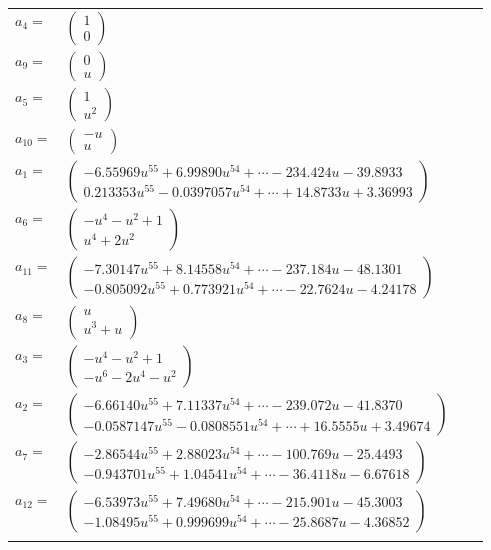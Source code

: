 \documentclass[1p]{elsarticle_modified}
\theoremstyle{definition}
\begin{document}
\begin{tabular}{m{7pt} m{180pt} m{7pt} m{180pt} }
\flushright $a_{4}=$&$\begin{pmatrix}1\\0\end{pmatrix}$ \\
\flushright $a_{9}=$&$\begin{pmatrix}0\\u\end{pmatrix}$ \\
\flushright $a_{5}=$&$\begin{pmatrix}1\\u^2\end{pmatrix}$ \\
\flushright $a_{10}=$&$\begin{pmatrix}- u\\u\end{pmatrix}$ \\
\flushright $a_{1}=$&$\begin{pmatrix}-6.55969 u^{55}+6.99890 u^{54}+\cdots-234.424 u-39.8933\\0.213353 u^{55}-0.0397057 u^{54}+\cdots+14.8733 u+3.36993\end{pmatrix}$ \\
\flushright $a_{6}=$&$\begin{pmatrix}- u^4- u^2+1\\u^4+2 u^2\end{pmatrix}$ \\
\flushright $a_{11}=$&$\begin{pmatrix}-7.30147 u^{55}+8.14558 u^{54}+\cdots-237.184 u-48.1301\\-0.805092 u^{55}+0.773921 u^{54}+\cdots-22.7624 u-4.24178\end{pmatrix}$ \\
\flushright $a_{8}=$&$\begin{pmatrix}u\\u^3+u\end{pmatrix}$ \\
\flushright $a_{3}=$&$\begin{pmatrix}- u^4- u^2+1\\- u^6-2 u^4- u^2\end{pmatrix}$ \\
\flushright $a_{2}=$&$\begin{pmatrix}-6.66140 u^{55}+7.11337 u^{54}+\cdots-239.072 u-41.8370\\-0.0587147 u^{55}-0.0808551 u^{54}+\cdots+16.5555 u+3.49674\end{pmatrix}$ \\
\flushright $a_{7}=$&$\begin{pmatrix}-2.86544 u^{55}+2.88023 u^{54}+\cdots-100.769 u-25.4493\\-0.943701 u^{55}+1.04541 u^{54}+\cdots-36.4118 u-6.67618\end{pmatrix}$ \\
\flushright $a_{12}=$&$\begin{pmatrix}-6.53973 u^{55}+7.49680 u^{54}+\cdots-215.901 u-45.3003\\-1.08495 u^{55}+0.999699 u^{54}+\cdots-25.8687 u-4.36852\end{pmatrix}$\\&\end{tabular}
\end{document}
